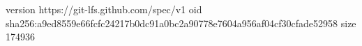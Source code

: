 version https://git-lfs.github.com/spec/v1
oid sha256:a9ed8559e66fcfc24217b0dc91a0bc2a90778e7604a956af04cf30cfade52958
size 174936
